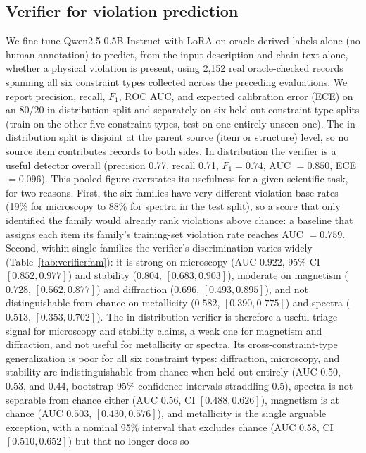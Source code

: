 \documentclass[pdflatex,sn-nature]{sn-jnl}
\newcommand{\rev}[1]{#1}
\newcommand{\rev}[1]{{\color{blue}#1}}
\begin{document}
\subsection*{Verifier for violation prediction}
We fine-tune Qwen2.5-0.5B-Instruct with LoRA on oracle-derived labels alone (no human
annotation) to predict, from the input description and chain text alone, whether a
physical violation is present, using 2{,}152 real oracle-checked records spanning all
six constraint types collected across the preceding evaluations. We report precision,
recall, $F_1$, ROC AUC, and expected calibration error (ECE) on an 80/20
in-distribution split and separately on six held-out-constraint-type splits (train on the
other five constraint types, test on one entirely unseen one). The in-distribution split
is disjoint at the parent source (item or structure) level, \rev{so no source item contributes
records to both sides}. In distribution the verifier is a useful
detector overall (precision 0.77, recall 0.71, $F_1=0.74$, AUC $=0.850$, ECE $=0.096$).
\rev{This pooled figure overstates its usefulness for a given scientific task, for two reasons.
First, the six families have very different violation base rates (19\% for microscopy to 88\%
for spectra in the test split), so a score that only identified the family would already rank
violations above chance: a baseline that assigns each item its family's training-set violation
rate reaches AUC $=0.759$. Second, within single families the verifier's discrimination varies
widely (Table~\ref{tab:verifierfam}): it is strong on microscopy (AUC $0.922$, 95\% CI
$[0.852,0.977]$) and stability ($0.804$, $[0.683,0.903]$), moderate on magnetism ($0.728$,
$[0.562,0.877]$) and diffraction ($0.696$, $[0.493,0.895]$), and not distinguishable from chance on
metallicity ($0.582$, $[0.390,0.775]$) and spectra ($0.513$, $[0.353,0.702]$). The in-distribution
verifier is therefore a useful triage signal for microscopy and stability claims, a weak one for
magnetism and diffraction, and not useful for metallicity or spectra.} Its
cross-constraint-type generalization is poor for all six constraint types: diffraction, microscopy, and stability
are indistinguishable from chance when held out entirely (AUC 0.50, 0.53, and 0.44,
bootstrap 95\% confidence intervals straddling 0.5), spectra is not separable from chance either (AUC
0.56, CI $[0.488,0.626]$)\rev{, magnetism is at chance (AUC $0.503$, $[0.430,0.576]$),} and metallicity is the single arguable exception, with a nominal
95\% interval that excludes chance (AUC 0.58, CI $[0.510,0.652]$) but that no longer does so
\end{document}
